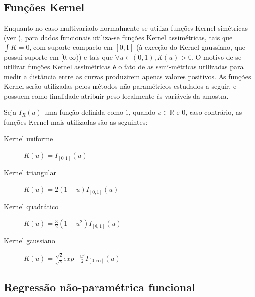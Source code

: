 \documentclass[
	12pt,				%
	openright,			%
	oneside,			%
	a4paper,			%
	english,			%
	brazil				%
	]{dissertacao-ufrgs-abntex2}
\begin{document}
\subsection{Funções Kernel}

Enquanto no caso multivariado normalmente se utiliza funções Kernel simétricas (ver ), para dados funcionais utiliza-se funções Kernel assimétricas, tais que $\int K = 0$, com suporte compacto em $[0,1]$ (à exceção do Kernel gaussiano, que possui suporte em $[0,\infty)$) e tais que $\forall u \in (0,1), K(u) > 0$. O motivo de se utilizar funções Kernel assimétricas é o fato de as semi-métricas utilizadas para medir a distância entre as curvas produzirem apenas valores positivos. As funções Kernel serão utilizadas pelos métodos não-paramétricos estudados a seguir, e possuem como finalidade atribuir peso localmente às variáveis da amostra.

Seja $I_R(u)$ uma função definida como $1$, quando $u \in \mathbb{R}$ e 0, caso contrário, as funções Kernel mais utilizadas são as seguintes:
\begin{description}
	\item[Kernel uniforme] $K(u)= I_{[0,1]}(u)$
    \item[Kernel triangular] $K(u)= 2(1-u)I_{[0,1]}(u)$
    \item[Kernel quadrático] $K(u)= \frac {3}{2} (1 - u^2) I_{[0,1]}(u)$
    \item[Kernel gaussiano] $K(u)= \frac {\sqrt{2}}{\sqrt{\pi}} exp{-\frac{u^2}{2}} I_{[0,\infty]}(u)$
\end{description}

\subsection{Regressão não-paramétrica funcional}
\label{metodos-previsao-npfda}
\end{document}
